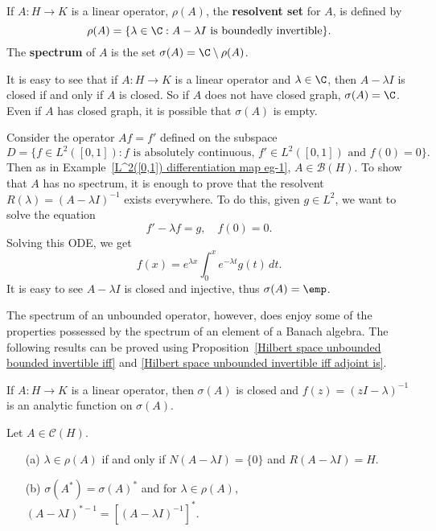 \begin{definition}
If $A:H\to K$ is a linear operator, $\rho(A)$, the \textbf{resolvent set} for $A$, is defined by
\[\rho(A)=\{\lambda\in\C:\text{$A-\lambda I$ is boundedly invertible}\}.\] The \textbf{spectrum} of $A$ is the set $\sigma(A)=\C\setminus\rho(A)$.
\end{definition}
It is easy to see that if $A:H\to K$ is a linear operator and $\lambda\in\C$, then $A-\lambda I$ is closed if and only if $A$ is closed. So if $A$ does not have closed graph, $\sigma(A)=\C$. Even if $A$ has closed graph, it is possible that $\sigma(A)$ is empty.
\begin{example}
Consider the operator $Af=f'$ defined on the subspace
\[D=\{f\in L^2([0,1]):\text{$f$ is absolutely continuous, $f'\in L^2([0,1])$ and $f(0)=0$}\}.\]
Then as in Example~\ref{L^2([0,1]) differentiation map eg-1}, $A\in\mathcal{B}(H)$. To show that $A$ has no spectrum, it is enough to prove that the resolvent $R(\lambda)=(A-\lambda I)^{-1}$ exists everywhere. To do this, given $g\in L^2$, we want to solve the equation
\[f'-\lambda f=g,\quad f(0)=0.\]
Solving this ODE, we get
\[f(x)=e^{\lambda x}\int_0^xe^{-\lambda t}g(t)\,dt.\]
It is easy to see $A-\lambda I$ is closed and injective, thus $\sigma(A)=\emp$.
\end{example}
The spectrum of an unbounded operator, however, does enjoy some of the properties possessed by the spectrum of an element of a Banach algebra. The following results can be proved using Proposition~\ref{Hilbert space unbounded bounded invertible iff} and \ref{Hilbert space unbounded invertible iff adjoint is}.
\begin{proposition}
If $A:H\to K$ is a linear operator, then $\sigma(A)$ is closed and $f(z)=(zI-\lambda)^{-1}$ is an analytic function on $\sigma(A)$.
\end{proposition}
\begin{proposition}
Let $A\in\mathcal{C}(H)$.
\begin{itemize}
\item[(a)] $\lambda\in\rho(A)$ if and only if $N(A-\lambda I)=\{0\}$ and $R(A-\lambda I)=H$.
\item[(b)] $\sigma(A^*)=\sigma(A)^*$ and for $\lambda\in\rho(A)$, $(A-\lambda I)^{*-1}=[(A-\lambda I)^{-1}]^*$.
\end{itemize}
\end{proposition}
